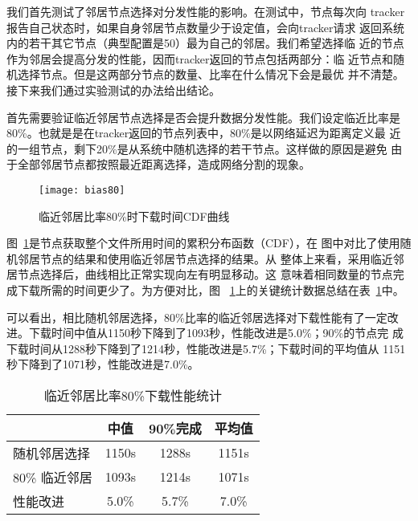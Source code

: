 我们首先测试了邻居节点选择对分发性能的影响。在测试中，节点每次向
tracker报告自己状态时，如果自身邻居节点数量少于设定值，会向tracker请求
返回系统内的若干其它节点（典型配置是50）最为自己的邻居。我们希望选择临
近的节点作为邻居会提高分发的性能，因而tracker返回的节点包括两部分：临
近节点和随机选择节点。但是这两部分节点的数量、比率在什么情况下会是最优
并不清楚。接下来我们通过实验测试的办法给出结论。

首先需要验证临近邻居节点选择是否会提升数据分发性能。我们设定临近比率是
80\%。也就是是在tracker返回的节点列表中，80\%是以网络延迟为距离定义最
近的一组节点，剩下20\%是从系统中随机选择的若干节点。这样做的原因是避免
由于全部邻居节点都按照最近距离选择，造成网络分割的现象。

\begin{figure}[htbp]
  \centering
  \begin{minipage}{0.6\linewidth}
    \centering
    \texttt{[image: bias80]}
    \caption{临近邻居比率80\%时下载时间CDF曲线}
    \label{fig:bias80}
  \end{minipage}
\end{figure}

图~\ref{fig:bias80}是节点获取整个文件所用时间的累积分布函数（CDF），在
图中对比了使用随机邻居节点的结果和使用临近邻居节点选择的结果。从
整体上来看，采用临近邻居节点选择后，曲线相比正常实现向左有明显移动。这
意味着相同数量的节点完成下载所需的时间更少了。为方便对比，图~
\ref{fig:bias80}上的关键统计数据总结在表~\ref{tbl:bias80}中。

可以看出，相比随机邻居选择，80\%比率的临近邻居选择对下载性能有了一定改
进。下载时间中值从1150秒下降到了1093秒，性能改进是5.0\%；90\%的节点完
成下载时间从1288秒下降到了1214秒，性能改进是5.7\%；下载时间的平均值从
1151秒下降到了1071秒，性能改进是7.0\%。

\begin{table}[htbp]
\centering
\begin{minipage}{0.6\linewidth}
\centering
\caption{临近邻居比率80\%下载性能统计}
\label{tbl:bias80}
\begin{tabular}{lccc}

\toprule[1.5pt]
    & 中值 & 90\%完成 & 平均值\\
\midrule[1pt]
随机邻居选择  & 1150s & 1288s & 1151s\\
80\% 临近邻居 & 1093s & 1214s & 1071s\\
性能改进      & 5.0\% & 5.7\% & 7.0\%\\
\bottomrule[1.5pt]
\end{tabular}
\end{minipage}
\end{table}

